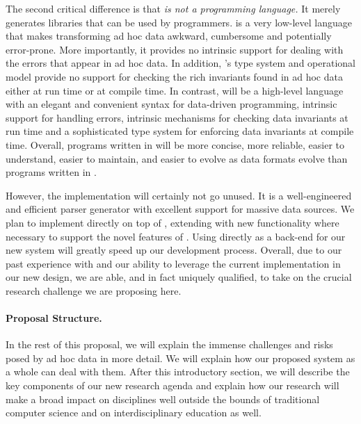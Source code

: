 \documentclass[11pt]{article}
\begin{document}
The second critical difference is that {\em \pads{} is not a programming
language.}  It merely generates libraries that can be used by \C{}
programmers.  \C{} is a very low-level language that makes
transforming ad hoc data awkward, cumbersome and potentially
error-prone.  More importantly, it provides no intrinsic support for
dealing with the errors that appear in ad hoc data.  In addition, \C's
type system and operational model provide no support for checking the
rich invariants found in ad hoc data either at run time or at compile
time.  In contrast, \datatype{} will be a high-level language with an
elegant and convenient syntax for data-driven programming, intrinsic
support for handling errors, intrinsic mechanisms for checking data
invariants at run time and a sophisticated type system for enforcing
data invariants at compile time.  Overall,
programs written in \datatype{} will be more concise, more reliable,
easier to understand,
easier to maintain, and easier to evolve as data formats evolve
than programs written in \C.

However, the \pads{} implementation will certainly not go unused.  It is a well-engineered
and efficient parser generator with excellent support for massive data sources.
We plan to implement \datatype{} directly on top of \pads{}, extending \pads{}
with new functionality where necessary to support the novel features 
of \datatype.  Using \pads{} directly as a back-end for our
new system will greatly speed up our development process.
Overall, due to our past experience with \pads{} and
our ability to leverage the current implementation in our new design,
we are able, and in fact uniquely qualified, to take on the crucial
research challenge we are proposing here.
  

\paragraph*{Proposal Structure.}
In the rest of this proposal, we will explain the immense
challenges and risks posed by ad hoc data in more detail.  We will
explain how our proposed system as a whole can deal with them.   
After this introductory section, we will describe the
key components of our new research agenda and explain how our research
will make a broad impact on disciplines well outside the bounds of
traditional computer science and on interdisciplinary education as well.
\end{document}
